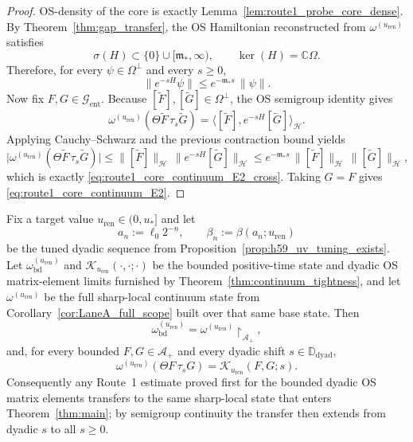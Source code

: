 \begin{proof}
OS-density of the core is exactly Lemma~\ref{lem:route1_probe_core_dense}.
By Theorem~\ref{thm:gap_transfer}, the OS Hamiltonian reconstructed from $\omega^{(u_{\mathrm{ren}})}$ satisfies
\[
\sigma(H)\subset\{0\}\cup[\mathfrak m_\ast,\infty),
\qquad
\ker(H)=\mathbb C\Omega.
\]
Therefore, for every $\psi\in\Omega^\perp$ and every $s\ge 0$,
\[
\|e^{-sH}\psi\|\le e^{-\mathfrak m_\ast s}\,\|\psi\|.
\]
Now fix $F,G\in\mathcal G_{\mathrm{ent}}$.
Because $[\widetilde F],[\widetilde G]\in\Omega^\perp$, the OS semigroup identity gives
\[
\omega^{(u_{\mathrm{ren}})}(\Theta \widetilde F\,\tau_s\widetilde G)
=\langle [\widetilde F],e^{-sH}[\widetilde G]\rangle_{\mathcal H}.
\]
Applying Cauchy--Schwarz and the previous contraction bound yields
\[
\big|\omega^{(u_{\mathrm{ren}})}(\Theta \widetilde F\,\tau_s\widetilde G)\big|
\le \|[\widetilde F]\|_{\mathcal H}\,\|e^{-sH}[\widetilde G]\|_{\mathcal H}
\le e^{-\mathfrak m_\ast s}\,\|[\widetilde F]\|_{\mathcal H}\,\|[\widetilde G]\|_{\mathcal H},
\]
which is exactly \eqref{eq:route1_core_continuum_E2_cross}.
Taking $G=F$ gives \eqref{eq:route1_core_continuum_E2}.
\end{proof}


\begin{theorem}\label{thm:route1_sharp_local_identification}
Fix a target value $u_{\mathrm{ren}}\in(0,u_\ast]$ and let
\[
a_n:=\ell_0 2^{-n},\qquad \beta_n:=\beta(a_n;u_{\mathrm{ren}})
\]
be the tuned dyadic sequence from Proposition~\ref{prop:h59_uv_tuning_exists}.
Let $\omega_{\mathrm{bd}}^{(u_{\mathrm{ren}})}$ and $\mathcal K_{u_{\mathrm{ren}}}(\cdot,\cdot;\cdot)$ be the bounded positive-time state and dyadic OS matrix-element limits furnished by Theorem~\ref{thm:continuum_tightness}, and let $\omega^{(u_{\mathrm{ren}})}$ be the full sharp-local continuum state from Corollary~\ref{cor:LaneA_full_scope} built over that same base state.
Then
\[
\omega_{\mathrm{bd}}^{(u_{\mathrm{ren}})} = \omega^{(u_{\mathrm{ren}})}\!\restriction_{\mathcal A_+},
\]
and, for every bounded $F,G\in\mathcal A_+$ and every dyadic shift $s\in\mathbb D_{\mathrm{dyad}}$,
\[
\omega^{(u_{\mathrm{ren}})}(\Theta F\,\tau_s G)=\mathcal K_{u_{\mathrm{ren}}}(F,G;s).
\]
Consequently any Route~1 estimate proved first for the bounded dyadic OS matrix elements transfers to the same sharp-local state that enters Theorem~\ref{thm:main}; by semigroup continuity the transfer then extends from dyadic $s$ to all $s\ge 0$.
\end{theorem}

